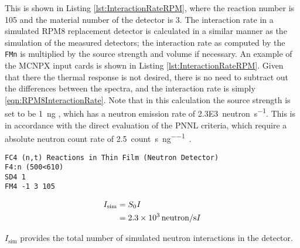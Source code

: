 This is shown in Listing \ref{lst:InteractionRateRPM}, where the reaction number is 105 and the material number of the detector is 3.
The interaction rate in a simulated RPM8 replacement detector is calculated in a similar manner as the simulation of the measured detectors; the interaction rate as computed by the \verb+FMn+ is multiplied by the source strength and volume if necessary.
An example of the MCNPX input cards is shown in Listing \ref{lst:InteractionRateRPM}.
Given that there the thermal response is not desired, there is no need to subtract out the differences between the spectra, and the interaction rate is simply \eqref{eqn:RPM8InteractionRate}.
Note that in this calculation the source strength is set to be \SI{1}{\nano\gram} , which has a neutron emission rate of \SI{2.3E3}{neutron\per\second}.
This is in accordance with the direct evaluation of the PNNL criteria, which require a absolute neutron count rate of \SI{2.5}{count\per\second\per\nano\gram{}}.
\begin{lstlisting}[caption={[RPM8 ${}^{6}\text{Li}\left(\text{n},\text{t}\right)\alpha$ Reaction Rate]RPM8 ${}^{6}\text{Li}\left(\text{n},\text{t}\right)\alpha$ Reaction Rate. The detector is all of the layers of cell 500 inside universe 610. This tally is multiplied by an SD card to normalize by the volume},label={lst:InteractionRateRPM}]
FC4 (n,t) Reactions in Thin Film (Neutron Detector)
F4:n (500<610)
SD4 1
FM4 -1 3 105
\end{lstlisting}
\begin{align}
  \label{eqn:RPM8InteractionRate}
  I_{\text{sim}} &= S_0 I \\
  &= \SI{2.3E3}{neutron\per\second} I
\end{align}

$I_{\text{sim}}$ provides the total number of simulated neutron interactions in the detector.

